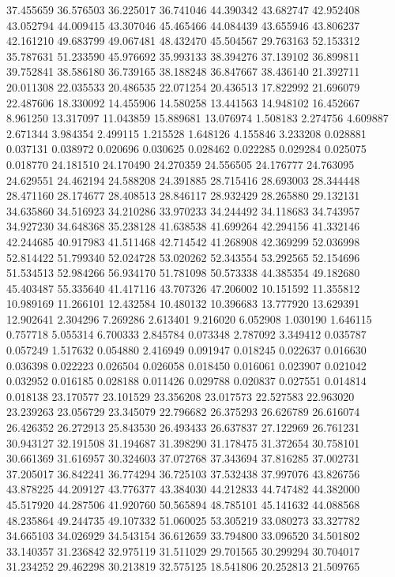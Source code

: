 37.455659
36.576503
36.225017
36.741046
44.390342
43.682747
42.952408
43.052794
44.009415
43.307046
45.465466
44.084439
43.655946
43.806237
42.161210
49.683799
49.067481
48.432470
45.504567
29.763163
52.153312
35.787631
51.233590
45.976692
35.993133
38.394276
37.139102
36.899811
39.752841
38.586180
36.739165
38.188248
36.847667
38.436140
21.392711
20.011308
22.035533
20.486535
22.071254
20.436513
17.822992
21.696079
22.487606
18.330092
14.455906
14.580258
13.441563
14.948102
16.452667
8.961250
13.317097
11.043859
15.889681
13.076974
1.508183
2.274756
4.609887
2.671344
3.984354
2.499115
1.215528
1.648126
4.155846
3.233208
0.028881
0.037131
0.038972
0.020696
0.030625
0.028462
0.022285
0.029284
0.025075
0.018770
24.181510
24.170490
24.270359
24.556505
24.176777
24.763095
24.629551
24.462194
24.588208
24.391885
28.715416
28.693003
28.344448
28.471160
28.174677
28.408513
28.846117
28.932429
28.265880
29.132131
34.635860
34.516923
34.210286
33.970233
34.244492
34.118683
34.743957
34.927230
34.648368
35.238128
41.638538
41.699264
42.294156
41.332146
42.244685
40.917983
41.511468
42.714542
41.268908
42.369299
52.036998
52.814422
51.799340
52.024728
53.020262
52.343554
53.292565
52.154696
51.534513
52.984266
56.934170
51.781098
50.573338
44.385354
49.182680
45.403487
55.335640
41.417116
43.707326
47.206002
10.151592
11.355812
10.989169
11.266101
12.432584
10.480132
10.396683
13.777920
13.629391
12.902641
2.304296
7.269286
2.613401
9.216020
6.052908
1.030190
1.646115
0.757718
5.055314
6.700333
2.845784
0.073348
2.787092
3.349412
0.035787
0.057249
1.517632
0.054880
2.416949
0.091947
0.018245
0.022637
0.016630
0.036398
0.022223
0.026504
0.026058
0.018450
0.016061
0.023907
0.021042
0.032952
0.016185
0.028188
0.011426
0.029788
0.020837
0.027551
0.014814
0.018138
23.170577
23.101529
23.356208
23.017573
22.527583
22.963020
23.239263
23.056729
23.345079
22.796682
26.375293
26.626789
26.616074
26.426352
26.272913
25.843530
26.493433
26.637837
27.122969
26.761231
30.943127
32.191508
31.194687
31.398290
31.178475
31.372654
30.758101
30.661369
31.616957
30.324603
37.072768
37.343694
37.816285
37.002731
37.205017
36.842241
36.774294
36.725103
37.532438
37.997076
43.826756
43.878225
44.209127
43.776377
43.384030
44.212833
44.747482
44.382000
45.517920
44.287506
41.920760
50.565894
48.785101
45.141632
44.088568
48.235864
49.244735
49.107332
51.060025
53.305219
33.080273
33.327782
34.665103
34.026929
34.543154
36.612659
33.794800
33.096520
34.501802
33.140357
31.236842
32.975119
31.511029
29.701565
30.299294
30.704017
31.234252
29.462298
30.213819
32.575125
18.541806
20.252813
21.509765
